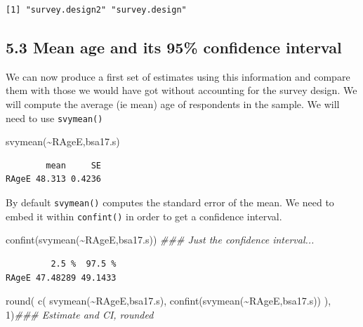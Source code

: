 \documentclass[
  14,
  a4paper,
  DIV=11,
  numbers=noendperiod]{scrartcl}
\newenvironment{Shaded}{\begin{snugshade}}{\end{snugshade}}
\newcommand{\DecValTok}[1]{\textcolor[rgb]{0.68,0.00,0.00}{#1}}
\newcommand{\DocumentationTok}[1]{\textcolor[rgb]{0.37,0.37,0.37}{\textit{#1}}}
\newcommand{\FunctionTok}[1]{\textcolor[rgb]{0.28,0.35,0.67}{#1}}
\newcommand{\NormalTok}[1]{\textcolor[rgb]{0.00,0.23,0.31}{#1}}
\newcommand{\SpecialCharTok}[1]{\textcolor[rgb]{0.37,0.37,0.37}{#1}}
\begin{document}
\begin{verbatim}
[1] "survey.design2" "survey.design" 
\end{verbatim}

\hypertarget{mean-age-and-its-95-confidence-interval}{%
\subsection{5.3 Mean age and its 95\% confidence
interval}\label{mean-age-and-its-95-confidence-interval}}

We can now produce a first set of estimates using this information and
compare them with those we would have got without accounting for the
survey design. We will compute the average (ie mean) age of respondents
in the sample. We will need to use \texttt{svymean()}

\begin{Shaded}
\begin{Highlighting}[]
\FunctionTok{svymean}\NormalTok{(}\SpecialCharTok{\textasciitilde{}}\NormalTok{RAgeE,bsa17.s)}
\end{Highlighting}
\end{Shaded}

\begin{verbatim}
        mean     SE
RAgeE 48.313 0.4236
\end{verbatim}

By default \texttt{svymean()} computes the standard error of the mean.
We need to\\
embed it within \texttt{confint()} in order to get a confidence
interval.

\begin{Shaded}
\begin{Highlighting}[]
\FunctionTok{confint}\NormalTok{(}\FunctionTok{svymean}\NormalTok{(}\SpecialCharTok{\textasciitilde{}}\NormalTok{RAgeE,bsa17.s)) }\DocumentationTok{\#\#\# Just the confidence interval...}
\end{Highlighting}
\end{Shaded}

\begin{verbatim}
         2.5 %  97.5 %
RAgeE 47.48289 49.1433
\end{verbatim}

\begin{Shaded}
\begin{Highlighting}[]
\FunctionTok{round}\NormalTok{(}
  \FunctionTok{c}\NormalTok{(}
    \FunctionTok{svymean}\NormalTok{(}\SpecialCharTok{\textasciitilde{}}\NormalTok{RAgeE,bsa17.s),}
    \FunctionTok{confint}\NormalTok{(}\FunctionTok{svymean}\NormalTok{(}\SpecialCharTok{\textasciitilde{}}\NormalTok{RAgeE,bsa17.s))}
\NormalTok{    ),}
  \DecValTok{1}\NormalTok{)}\DocumentationTok{\#\#\# Estimate and CI, rounded}
\end{Highlighting}
\end{Shaded}
\end{document}

